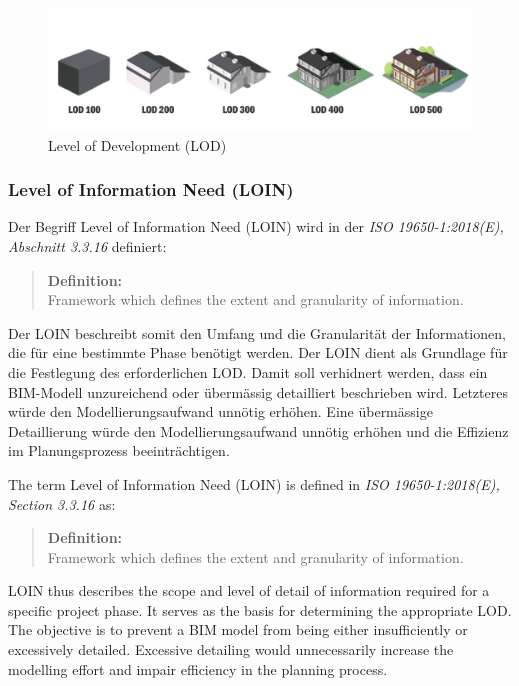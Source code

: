     \begin{figure}[h]
        \centering
        \includegraphics[width=1\textwidth]{images/bim_levels_of_development.png}
        \caption{Level of Development (LOD) \cite{ncircletechBIMLevelDevelopment}}
        \label{fig:Level_of_Development}
    \end{figure}

\subsubsection{Level of Information Need (LOIN)}
\begin{German}
    Der Begriff Level of Information Need (LOIN) wird in der \textit{ISO 19650-1:2018(E), Abschnitt 3.3.16} definiert:
    \begin{quote}
        \textbf{Definition:}\\
        Framework which defines the extent and granularity of information.
    \end{quote}

    Der LOIN beschreibt somit den Umfang und die Granularität der Informationen, die für eine bestimmte Phase benötigt werden. Der LOIN dient als Grundlage für die Festlegung des erforderlichen LOD. Damit soll verhidnert werden, dass ein BIM-Modell unzureichend oder übermässig detailliert beschrieben wird. Letzteres würde den Modellierungsaufwand unnötig erhöhen. Eine übermässige Detaillierung würde den Modellierungsaufwand unnötig erhöhen und die Effizienz im Planungsprozess beeinträchtigen. \cite{astourLehrbuchGrundlagenBIMArbeitsmethode2022}
\end{German}

\begin{English}
    The term Level of Information Need (LOIN) is defined in \textit{ISO 19650-1:2018(E), Section 3.3.16} as:
    \begin{quote}
        \textbf{Definition:}\\
        Framework which defines the extent and granularity of information.
    \end{quote}

    LOIN thus describes the scope and level of detail of information required for a specific project phase. It serves as the basis for determining the appropriate LOD. The objective is to prevent a BIM model from being either insufficiently or excessively detailed. Excessive detailing would unnecessarily increase the modelling effort and impair efficiency in the planning process. \cite{astourLehrbuchGrundlagenBIMArbeitsmethode2022}
\end{English}

